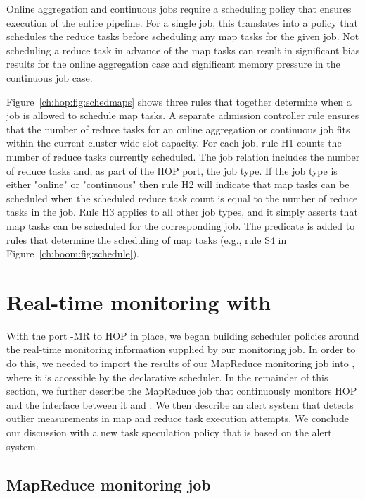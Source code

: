 Online aggregation and continuous jobs require a scheduling policy that
ensures execution of the entire pipeline. For a single job, this translates into a policy that
schedules the reduce tasks before scheduling any map tasks for the given job. Not scheduling
a reduce task in advance of the map tasks can result in significant bias results for the online 
aggregation case and significant memory pressure in the continuous job case. 

Figure~\ref{ch:hop:fig:schedmaps} shows three rules that together determine when a job is allowed
to schedule map tasks. A separate admission controller rule ensures that the number of reduce tasks for an
online aggregation or continuous job fits within the current cluster-wide slot capacity. For each job, rule H1 counts the 
number of reduce tasks currently scheduled. The job relation includes the number of reduce tasks and, as part of the HOP 
port, the job type. If the job type is either "online" or "continuous" then rule H2 will indicate that map tasks can be scheduled
when the scheduled reduce task count is equal to the number of reduce tasks in the job. Rule H3 applies
to all other job types, and it simply asserts that map tasks can be scheduled for the corresponding job. 
The  predicate is added to rules that determine the scheduling of map tasks 
(e.g., rule S4 in Figure~\ref{ch:boom:fig:schedule}).

\section{Real-time monitoring with \JOL}
\label{ch:hop:sec:jolmonitor}

With the port \BOOM-MR to HOP in place, we began building scheduler policies around the real-time monitoring information supplied by our
monitoring job. In order to do this, we needed to import the results of our MapReduce monitoring job into \JOL, where
it is accessible by the declarative scheduler. In the remainder of this section, we further describe the MapReduce job that
continuously monitors HOP and the interface between it and \JOL. We then describe an alert system that detects outlier measurements in map and 
reduce task execution attempts. We conclude our discussion with a new task speculation policy that is based on the alert system.

\subsection{MapReduce monitoring job}

